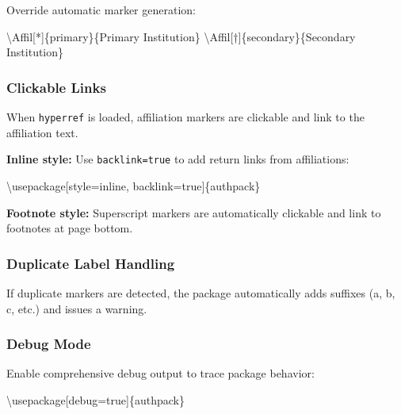 \documentclass[
]{article}
\newenvironment{Shaded}{}{}
\newcommand{\BuiltInTok}[1]{#1}
\newcommand{\ExtensionTok}[1]{#1}
\newcommand{\FunctionTok}[1]{\textcolor[rgb]{0.02,0.16,0.49}{#1}}
\newcommand{\NormalTok}[1]{#1}
\begin{document}
Override automatic marker generation:

\begin{Shaded}
\begin{Highlighting}[]
\FunctionTok{\textbackslash{}Affil}\NormalTok{[*]\{primary\}\{Primary Institution\}}
\FunctionTok{\textbackslash{}Affil}\NormalTok{[†]\{secondary\}\{Secondary Institution\}}
\end{Highlighting}
\end{Shaded}

\hypertarget{clickable-links}{%
\subsubsection{Clickable Links}\label{clickable-links}}

When \texttt{hyperref} is loaded, affiliation markers are clickable and
link to the affiliation text.

\textbf{Inline style:} Use \texttt{backlink=true} to add return links
from affiliations:

\begin{Shaded}
\begin{Highlighting}[]
\BuiltInTok{\textbackslash{}usepackage}\NormalTok{[style=inline, backlink=true]\{}\ExtensionTok{authpack}\NormalTok{\}}
\end{Highlighting}
\end{Shaded}

\textbf{Footnote style:} Superscript markers are automatically clickable
and link to footnotes at page bottom.

\hypertarget{duplicate-label-handling}{%
\subsubsection{Duplicate Label
Handling}\label{duplicate-label-handling}}

If duplicate markers are detected, the package automatically adds
suffixes (a, b, c, etc.) and issues a warning.

\hypertarget{debug-mode}{%
\subsubsection{Debug Mode}\label{debug-mode}}

Enable comprehensive debug output to trace package behavior:

\begin{Shaded}
\begin{Highlighting}[]
\BuiltInTok{\textbackslash{}usepackage}\NormalTok{[debug=true]\{}\ExtensionTok{authpack}\NormalTok{\}}
\end{Highlighting}
\end{Shaded}
\end{document}
